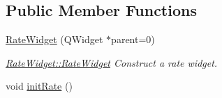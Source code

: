 \subsection*{Public Member Functions}
\begin{DoxyCompactItemize}
\item 
\hyperlink{classRateWidget_ad1cb6a97e47b408043e83708ff8af15e}{Rate\+Widget} (Q\+Widget $\ast$parent=0)
\begin{DoxyCompactList}\small\item\em \hyperlink{classRateWidget_ad1cb6a97e47b408043e83708ff8af15e}{Rate\+Widget\+::\+Rate\+Widget} Construct a rate widget. \end{DoxyCompactList}\item 
\hypertarget{classRateWidget_a4a3ec9a546055d6ecb3bd1a9ee8082a6}{void \hyperlink{classRateWidget_a4a3ec9a546055d6ecb3bd1a9ee8082a6}{init\+Rate} ()}\label{classRateWidget_a4a3ec9a546055d6ecb3bd1a9ee8082a6}


\end{DoxyCompactItemize}

